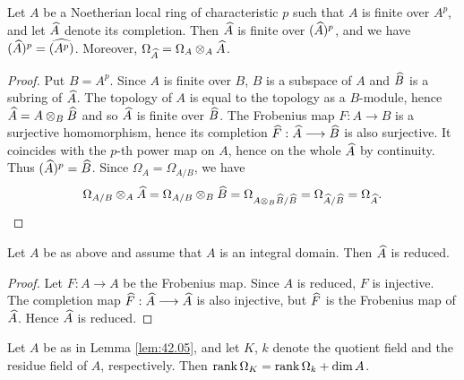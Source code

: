 \documentclass[../main]{subfiles}
\begin{document}
\begin{lemma}\label{lem:42.04}
Let $A$ be a Noetherian local ring of characteristic $p$ such that $A$ is finite over $A^p$, and let $\widehat{A}$ denote its completion. Then $\widehat{A}$ is finite over $(\widehat{A})^p$, and we have $(\widehat{A})^p=\widehat{(A^p)}$. Moreover, $\Omega_{\widehat{A}}=\Omega_A \otimes_A \widehat{A}$.
\end{lemma}

\begin{proof}
Put $B=A^p$. Since $A$ is finite over $B$, $B$ is a subspace of $A$ and $\widehat{B}$ is a subring of $\widehat{A}$. The topology of $A$ is equal to the topology as a $B$-module, hence $\widehat{A}=A \otimes_B \widehat{B}$ and so $\widehat{A}$ is finite over $\widehat{B}$. The Frobenius map $F: A\longrightarrow B$ is a surjective homomorphism, hence its completion $\widehat{F}: \widehat{A}\longrightarrow \widehat{B}$ is also surjective. It coincides with the $p$-th power map on $A$, hence on the whole $\widehat{A}$ by continuity. Thus $(\widehat{A})^p=\widehat{B}$. Since $\Omega_A=\Omega_{A / B}$, we have \[\Omega_{A / B} \otimes_A \widehat{A}=\Omega_{A / B} \otimes_B \widehat{B}=\Omega_{A \otimes_B \widehat{B}/\widehat{B}}=\Omega_{\widehat{A} / \widehat{B}}=\Omega_{\widehat{A}}.\]
\end{proof}

\begin{lemma}\label{lem:42.05}
Let $A$ be as above and assume that $A$ is an integral domain. Then $\widehat{A}$ is reduced.
\end{lemma}

\begin{proof}
Let $F: A\longrightarrow A$ be the Frobenius map. Since $A$ is reduced, $F$ is injective. The completion map $\widehat{F}: \widehat{A}\longrightarrow \widehat{A}$ is also injective, but $\widehat{F}$ is the Frobenius map of $\widehat{A}$. Hence $\widehat{A}$ is reduced.
\end{proof}

\begin{lemma}\label{lem:42.06}
Let $A$ be as in Lemma \ref{lem:42.05}, and let $K$, $k$ denote the quotient field and the residue field of $A$, respectively. Then $\operatorname{rank}\Omega_K=\operatorname{rank} \Omega_k+\operatorname{dim} A$.
\end{lemma}
\end{document}
